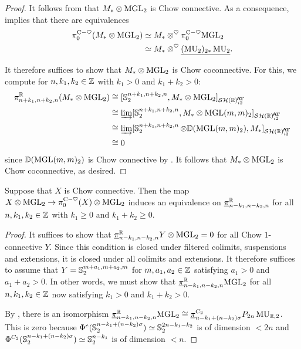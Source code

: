 \begin{proof}
  It follows from  that $M_* \otimes \mathrm{MGL}_2$ is Chow connective.
  As a consequence,  implies that there are equivalences
  \begin{align*}
    \pi_0 ^{\mathrm{C}-\heartsuit} (M_* \otimes \mathrm{MGL}_2) &\simeq M_* \otimes^{\heartsuit} \pi_0 ^{\mathrm{C}-\heartsuit} \mathrm{MGL}_2 \\
    &\simeq M_* \otimes^{\heartsuit} \underline{(\operatorname{\mathrm{MU}}_2)_{2*} \operatorname{\mathrm{MU}}_2}.
  \end{align*}

  It therefore suffices to show that $M_* \otimes \mathrm{MGL}_2$ is Chow coconnective.
  For this, we compute for $n,k_1, k_2 \in \mathbb{Z}$ with $k_1 > 0$ and $k_1+ k_2 > 0$:
  \begin{align*}
    \pi_{n+k_1, n+k_2, n} ^{\R} (M _* \otimes \MGL_2) &\cong [\Ss_2^{n+k_1, n+k_2, n}, M _* \otimes \MGL_2]_{\SHRat} \\
    &\cong \varinjlim [\Ss_2^{n+k_1, n+k_2, n}, M_* \otimes \MGL(m,m)_2]_{\SHRat} \\
    &\cong \varinjlim [\Ss_2^{n+k_1, n+k_2, n} \otimes \mathbb{D} (\MGL(m,m)_2), M_*]_{\SHRat} \\
    &\cong 0
  \end{align*}
  since $\mathbb{D} (\mathrm{MGL}(m,m)_2)$ is Chow connective by .
  It follows that $M_* \otimes \mathrm{MGL}_2$ is Chow coconnective, as desired.
\end{proof}

\begin{lem} \label{lem:MGL-tensor-thing}
  Suppose that $X$ is Chow connective. Then the map $X \otimes \mathrm{MGL}_2 \to \pi_0 ^{\mathrm{C}-\heartsuit} (X) \otimes \mathrm{MGL}_2$ induces an equivalence on $\underline{\pi}_{n-k_1,n-k_2,n} ^{\mathbb{R}}$ for all $n,k_1,k_2 \in \mathbb{Z}$ with $k_1 \geq 0$ and $k_1 + k_2 \geq 0$.
\end{lem}

\begin{proof}
  It suffices to show that $\underline{\pi}_{n-k_1, n-k_2, n} ^{\mathbb{R}} Y \otimes \mathrm{MGL}_2 = 0$ for all Chow $1$-connective $Y$.
  Since this condition is closed under filtered colimits, suspensions and extensions, it is closed under all colimits and extensions. It therefore suffices to assume that $Y = \operatorname{\mathbb{S}}_2^{m+a_1, m+a_2, m}$ for $m,a_1,a_2 \in \mathbb{Z}$ satisfying $a_1 > 0$ and $a_1 + a_2 > 0$.
  In other words, we must show that $\underline{\pi}_{n-k_1, n-k_2, n} ^{\mathbb{R}} \mathrm{MGL}_2$ for all $n,k_1, k_2 \in \mathbb{Z}$ now satisfying $k_1 > 0$ and $k_1 + k_2 > 0$.

  By , there is an isomorphism $\underline{\pi}_{n-k_1, n-k_2, n} ^{\mathbb{R}} \mathrm{MGL}_2 \cong \underline{\pi}_{n-k_1 + (n-k_2)\sigma} ^{C_2} P_{2n} \operatorname{\mathrm{MU}}_{\mathbb{R},2}$. This is zero because $\Phi^{e} (\operatorname{\mathbb{S}}_2^{n-k_1 + (n-k_2)\sigma}) \simeq \operatorname{\mathbb{S}}_2^{2n-k_1-k_2}$ is of dimension $< 2n$ and $\Phi^{C_2} (\operatorname{\mathbb{S}}_2^{n-k_1 + (n-k_2) \sigma}) \simeq \operatorname{\mathbb{S}}_2^{n-k_1}$ is of dimension $< n$. %
\end{proof}

